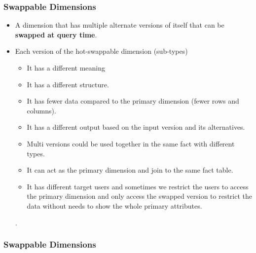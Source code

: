 \VideoClassification[column=1, colour=blue]
\begin{frame}
\frametitle{Swappable Dimensions}
	\begin{itemize}[<+->]
		\item A dimension that has multiple alternate versions of itself that can be \textbf{swapped at query time}.
		\item Each version of the hot-swappable dimension (sub-types)
			\begin{itemize}[<+->]
				\item It has a different meaning
				\item It has a different structure.
				\item It has fewer data compared to the primary dimension (fewer rows and columns).
				\item It has a different output based on the input version and its alternatives.
				\item Multi versions could be used together in the same fact with different types.
				\item It can act as the primary dimension and join to the same fact table.
				\item It has different target users and sometimes we restrict the users to access the primary dimension and only access the swapped version to restrict the data without needs to show the whole primary attributes.

			\end{itemize}.
	\end{itemize}
	
\end{frame}
\begin{frame}
\frametitle{Swappable Dimensions}
\centering


\end{frame}
